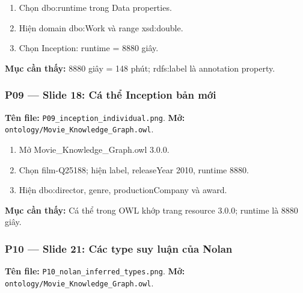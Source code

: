\documentclass[
  11pt,
]{article}
\providecommand{\tightlist}{%
  \setlength{\itemsep}{0pt}\setlength{\parskip}{0pt}}
\begin{document}
\begin{enumerate}
\def\labelenumi{\arabic{enumi}.}
\tightlist
\item
  Chọn dbo:runtime trong Data properties.
\item
  Hiện domain dbo:Work và range xsd:double.
\item
  Chọn Inception: runtime = 8880 giây.
\end{enumerate}

\textbf{Mục cần thấy:} 8880 giây = 148 phút; rdfs:label là annotation
property.

\subsubsection{P09 --- Slide 18: Cá thể Inception bản
mới}\label{p09-slide-18-cuxe1-thux1ec3-inception-bux1ea3n-mux1edbi}

\textbf{Tên file:}
\texttt{P09\_\allowbreak{}ince\allowbreak{}ption\_\allowbreak{}in\allowbreak{}dividual\allowbreak{}.\allowbreak{}png}.
\textbf{Mở:}
\texttt{ontology\allowbreak{}/\allowbreak{}\allowbreak{}Movie\_\allowbreak{}\allowbreak{}K\allowbreak{}nowledge\allowbreak{}\_\allowbreak{}\allowbreak{}Graph.\allowbreak{}o\allowbreak{}wl}.

\begin{enumerate}
\def\labelenumi{\arabic{enumi}.}
\tightlist
\item
  Mở
  Movie\_\allowbreak{}\allowbreak{}Kn\allowbreak{}owledge\_\allowbreak{}\allowbreak{}Graph.\allowbreak{}ow\allowbreak{}l
  3.0.0.
\item
  Chọn film-Q25188; hiện label, releaseYear 2010, runtime 8880.
\item
  Hiện dbo:\allowbreak{}dire\allowbreak{}ctor, genre,
  producti\allowbreak{}on\allowbreak{}Compan\allowbreak{}y và award.
\end{enumerate}

\textbf{Mục cần thấy:} Cá thể trong OWL khớp trang resource 3.0.0;
runtime là 8880 giây.

\subsubsection{P10 --- Slide 21: Các type suy luận của
Nolan}\label{p10-slide-21-cuxe1c-type-suy-luux1eadn-cux1ee7a-nolan}

\textbf{Tên file:}
\texttt{P10\_\allowbreak{}nola\allowbreak{}n\_\allowbreak{}inferr\allowbreak{}ed\_\allowbreak{}types\allowbreak{}.\allowbreak{}png}.
\textbf{Mở:}
\texttt{ontology\allowbreak{}/\allowbreak{}\allowbreak{}Movie\_\allowbreak{}\allowbreak{}K\allowbreak{}nowledge\allowbreak{}\_\allowbreak{}\allowbreak{}Graph.\allowbreak{}o\allowbreak{}wl}.
\end{document}
